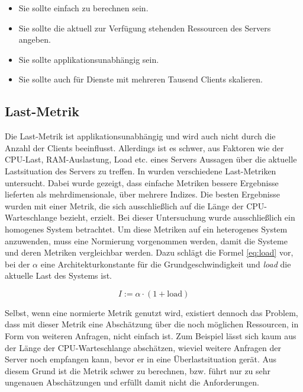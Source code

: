 \documentclass[a4paper, 12pt, BCOR10mm, DIV12, toc=bibliography, toc=listof, german]{scrbook}
\begin{document}
		\begin{itemize}
			\item Sie sollte einfach zu berechnen sein.
			\item Sie sollte die aktuell zur Verfügung stehenden Ressourcen des Servers angeben.
			\item Sie sollte applikationsunabhängig sein.
			\item Sie sollte auch für Dienste mit mehreren Tausend Clients skalieren.
		\end{itemize}

		\subsection*{Last-Metrik} %

		Die Last-Metrik ist applikationsunabhängig und wird auch nicht durch die Anzahl der Clients
		beeinflusst. Allerdings ist es schwer, aus Faktoren wie der CPU-Last, RAM-Auslastung, Load etc.
		eines Servers Aussagen über die aktuelle Lastsituation des Servers zu treffen. In
		\cite{kunz1991} wurden verschiedene Last-Metriken untersucht. Dabei wurde gezeigt, dass einfache
		Metriken bessere Ergebnisse lieferten als mehrdimensionale, über mehrere Indizes. Die
		besten Ergebnisse wurden mit einer Metrik, die sich ausschließlich auf die Länge der
		CPU-Warteschlange bezieht, erzielt. Bei dieser Untersuchung wurde ausschließlich ein homogenes System
		betrachtet. Um diese Metriken auf ein heterogenes System anzuwenden, muss eine Normierung
		vorgenommen werden, damit die Systeme und deren Metriken vergleichbar werden. Dazu schlägt
		\cite{lansch1994} die Formel \ref{eq:load} vor, bei der $\alpha$ eine Architekturkonstante für
		die Grundgeschwindigkeit und \textit{load} die aktuelle Last des Systems ist.

		\begin{equation}
			I := \alpha \cdot (1 + \text{load})
			\label{eq:load}
		\end{equation}

		Selbst, wenn eine normierte Metrik genutzt wird, existiert dennoch das Problem, dass mit dieser
		Metrik eine Abschätzung über die noch möglichen Ressourcen, in Form von weiteren Anfragen, nicht
		einfach ist. Zum Beispiel lässt sich kaum aus der Länge der CPU-Warteschlange abschätzen,
		wieviel weitere Anfragen der Server noch empfangen kann, bevor er in eine Überlastsituation
		gerät. Aus diesem Grund ist die Metrik schwer zu berechnen, bzw. führt nur zu sehr ungenauen
		Abschätzungen und erfüllt damit nicht die Anforderungen.
\end{document}
